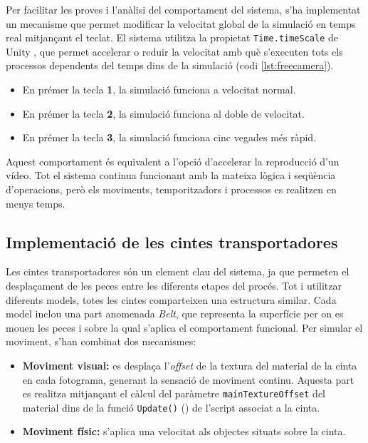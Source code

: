 \documentclass[a4paper,11pt,DIV=13,headings=normal,abstract=true,twoside=semi]{article}
\begin{document}
Per facilitar les proves i l'anàlisi del comportament del sistema, s'ha implementat un mecanisme que permet modificar la velocitat global de la simulació en temps real mitjançant el teclat. El sistema utilitza la propietat \texttt{Time.timeScale} de Unity \cite{UnityTimeScale}, que permet accelerar o reduir la velocitat amb què s'executen tots els processos dependents del temps dins de la simulació (codi \ref{lst:freecamera}).

\begin{itemize}
\item En prémer la tecla \textbf{1}, la simulació funciona a velocitat normal.
\item En prémer la tecla \textbf{2}, la simulació funciona al doble de velocitat.
\item En prémer la tecla \textbf{3}, la simulació funciona cinc vegades més ràpid.
\end{itemize}

Aquest comportament és equivalent a l'opció d'accelerar la reproducció d'un vídeo. Tot el sistema continua funcionant amb la mateixa lògica i seqüència d'operacions, però els moviments, temporitzadors i processos es realitzen en menys temps.

\subsection{Implementació de les cintes transportadores}

Les cintes transportadores són un element clau del sistema, ja que permeten el desplaçament de les peces entre les diferents etapes del procés. Tot i utilitzar diferents models, totes les cintes comparteixen una estructura similar. Cada model inclou una part anomenada \textit{Belt}, que representa la superfície per on es mouen les peces i sobre la qual s'aplica el comportament funcional.  Per simular el moviment, s'han combinat dos mecanismes:

\begin{itemize}
\item \textbf{Moviment visual:} es desplaça l'\textit{offset} de la textura del material de la cinta en cada fotograma, generant la sensació de moviment continu. Aquesta part es realitza mitjançant el càlcul del paràmetre \texttt{mainTextureOffset} del material dins de la funció \texttt{Update()} (\cite{UnityUpdate}) de l'script associat a la cinta.
\item \textbf{Moviment físic:} s'aplica una velocitat als objectes situats sobre la cinta.
\end{itemize}
\end{document}
